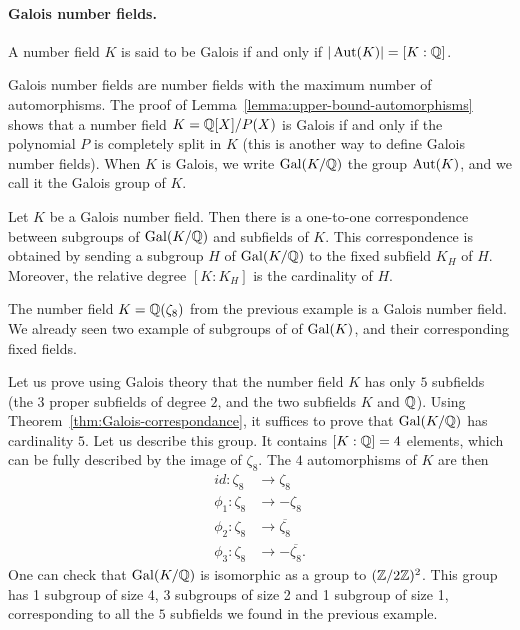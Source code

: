 \paragraph{Galois number fields.} 

\begin{definition}
A number field $K$ is said to be Galois if and only if $|\operatorname{Aut}(K)| = [K:\mathbb{Q}]$.
\end{definition}
Galois number fields are number fields with the maximum number of automorphisms. The proof of Lemma~\ref{lemma:upper-bound-automorphisms} shows that a number field $K = \mathbb{Q}[X]/P(X)$ is Galois if and only if the polynomial $P$ is completely split in $K$ (this is another way to define Galois number fields). When $K$ is Galois, we write $\operatorname{Gal}(K/\mathbb{Q})$ the group $\operatorname{Aut}(K)$, and we call it the Galois group of $K$.

\begin{theorem}
\label{thm:Galois-correspondance}
Let $K$ be a Galois number field. Then there is a one-to-one correspondence between subgroups of $\operatorname{Gal}(K/\mathbb{Q})$ and subfields of $K$. This correspondence is obtained by sending a subgroup $H$ of $\operatorname{Gal}(K/\mathbb{Q})$ to the fixed subfield $K_H$ of $H$. Moreover, the relative degree $[K:K_H]$ is the cardinality of $H$.
\end{theorem}

\begin{example}
The number field $K = \mathbb{Q}(\zeta_8)$ from the previous example is a Galois number field. We already seen two example of subgroups of of $\operatorname{Gal}(K)$, and their corresponding fixed fields.

Let us prove using Galois theory that the number field $K$ has only $5$ subfields (the $3$ proper subfields of degree $2$, and the two subfields $K$ and $\mathbb{Q}$). Using Theorem~\ref{thm:Galois-correspondance}, it suffices to prove that $\operatorname{Gal}(K/\mathbb{Q})$ has cardinality $5$. Let us describe this group. It contains $[K:\mathbb{Q}] = 4$ elements, which can be fully described by the image of $\zeta_8$. The $4$ automorphisms of $K$ are then
\begin{align*}
id: \zeta_8 &\rightarrow \zeta_8 \\
\phi_1: \zeta_8 &\rightarrow -\zeta_8 \\
\phi_2: \zeta_8 &\rightarrow \overline{\zeta_8} \\
\phi_3: \zeta_8 &\rightarrow -\overline{\zeta_8}.
\end{align*}
One can check that $\operatorname{Gal}(K/\mathbb{Q})$ is isomorphic as a group to $(\mathbb{Z}/2\mathbb{Z})^2$. This group has 1 subgroup of size 4, 3 subgroups of size 2 and 1 subgroup of size 1, corresponding to all the $5$ subfields we found in the previous example.
\end{example}


